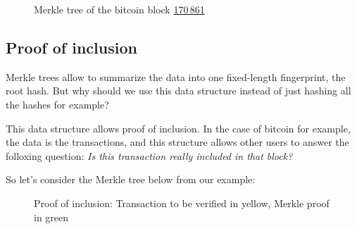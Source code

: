 \begin{figure}[H]
    \centering
{}
    \caption{Merkle tree of the bitcoin block \href{"https://blockchair.com/bitcoin/block/170861"}{170 861}}
    \label{fig:Merkletree}
\end{figure}

\subsection{Proof of inclusion} \label{Merkle:inclusion}

Merkle trees allow to summarize the data into one fixed-length fingerprint, the root hash. 
But why should we use this data structure instead of just hashing all the hashes for example?

This data structure allows proof of inclusion. In the case of bitcoin for example, the data is the transactions, and this structure allows other users to answer the folloxing question: \textit{Is this transaction really included in that block?}

So let's consider the Merkle tree below from our example:


\begin{figure}[H]
    \centering
{}
    \caption{Proof of inclusion: Transaction to be verified in yellow, Merkle proof in green}
    \label{fig:Merkleproof}
\end{figure}


